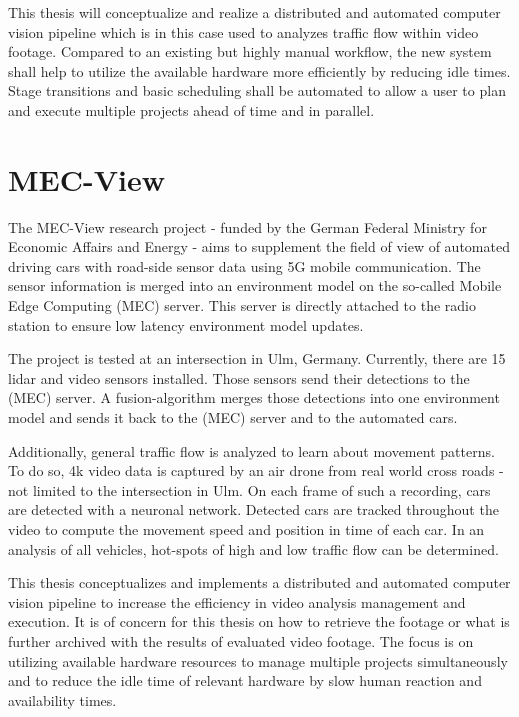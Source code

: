 This thesis will conceptualize and realize a distributed and automated computer vision pipeline which is in this case used to analyzes traffic flow within video footage.
Compared to an existing but highly manual workflow, the new system shall help to utilize the available hardware more efficiently by reducing idle times.
Stage transitions and basic scheduling shall be automated to allow a user to plan and execute multiple projects ahead of time and in parallel.



\newpage
\section{MEC-View}


The MEC-View research project\cite{mecview:main} - funded by the German Federal Ministry for Economic Affairs and Energy - aims to supplement the field of view of automated driving cars with road-side sensor data using 5G mobile communication. The sensor information is merged into an environment model on the so-called Mobile Edge Computing (MEC) server. This server is directly attached to the radio station to ensure low latency environment model updates.

The project is tested at an intersection in Ulm, Germany.
Currently, there are 15 lidar and video sensors installed.
Those sensors send their detections to the (MEC) server.
A fusion-algorithm merges those detections into one environment model and sends it back to the (MEC) server and to the automated cars.

Additionally, general traffic flow is analyzed to learn about movement patterns.
To do so, 4k video data is captured by an air drone from real world cross roads - not limited to the intersection in Ulm.
On each frame of such a recording, cars are detected with a neuronal network.
Detected cars are tracked throughout the video to compute the movement speed and position in time of each car.
In an analysis of all vehicles, hot-spots of high and low traffic flow can be determined.

This thesis conceptualizes and implements a distributed and automated computer vision pipeline to increase the efficiency in video analysis management and execution.
It is of concern for this thesis on how to retrieve the footage or what is further archived with the results of evaluated video footage.
The focus is on utilizing available hardware resources to manage multiple projects simultaneously and to reduce the idle time of relevant hardware by slow human reaction and availability times. 

